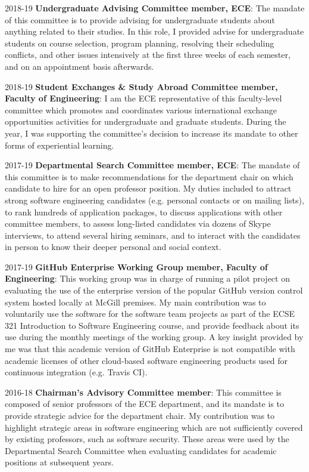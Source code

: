 \begin{yearlist}
\item[2018-19] \textbf{Undergraduate Advising Committee member, ECE}: 
The mandate of this committee is to provide advising for undergraduate students about anything related to their studies. 
In this role, I provided advise for undergraduate students on course selection, program planning, resolving their scheduling conflicts, and other issues intensively at the first three weeks of each semester, and on an appointment basis afterwards. 


\item[2018-19] \textbf{Student Exchanges \& Study Abroad Committee member, Faculty of Engineering}: I am the ECE representative of this faculty-level committee which promotes and coordinates various international exchange opportunities activities for undergraduate and graduate students. During the year, I was supporting the committee's decision to increase its mandate to other forms of experiential learning. 
\item[2017-19] \textbf{Departmental Search Committee member, ECE}: The mandate of this committee is to make recommendations for the department chair on which candidate to hire for an open professor position. My duties included to attract strong software engineering candidates (e.g. personal contacts or on mailing lists), to rank hundreds of application packages, to discuss applications with other committee members, to assess long-listed candidates via dozens of Skype interviews, to attend several hiring seminars, and to interact with the candidates in person to know their deeper personal and social context.
\item[2017-19] \textbf{GitHub Enterprise Working Group member, Faculty of Engineering}: This working group was in charge of running a pilot project on evaluating the use of the enterprise version of the popular GitHub version control system hosted locally at McGill premises. My main contribution was to voluntarily use the software for the software team projects as part of the ECSE 321 Introduction to Software Engineering course, and provide feedback about its use during the monthly meetings of the working group. A key insight provided by me was that this academic version of GitHub Enterprise is not compatible with academic licenses of other cloud-based software engineering products used for continuous integration (e.g. Travis CI).
\item[2016-18] \textbf{Chairman's Advisory Committee member}: This committee is composed of senior professors of the ECE department, and its mandate is to provide strategic advice for the department chair. My contribution was to highlight strategic areas in software engineering which are not sufficiently covered by existing professors, such as software security. These areas were used by the Departmental Search Committee when evaluating candidates for academic positions at subsequent years.

\end{yearlist}

